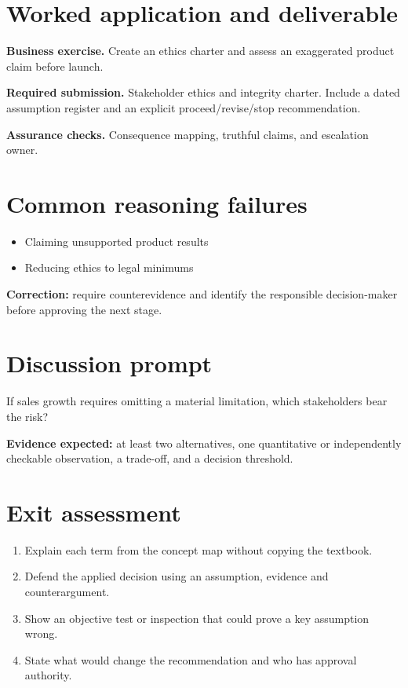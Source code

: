 \documentclass[11pt,letterpaper]{article}
\begin{document}
\section{Worked application and deliverable}
\textbf{Business exercise.} Create an ethics charter and assess an exaggerated product claim before launch.\par\textbf{Required submission.} Stakeholder ethics and integrity charter. Include a dated assumption register and an explicit proceed/revise/stop recommendation.\par\textbf{Assurance checks.} Consequence mapping, truthful claims, and escalation owner.
\section{Common reasoning failures}
\begin{itemize}[leftmargin=*,itemsep=3pt]
\item Claiming unsupported product results
\item Reducing ethics to legal minimums
\end{itemize}
\noindent\textbf{Correction:} require counterevidence and identify the responsible decision-maker before approving the next stage.
\section{Discussion prompt}
If sales growth requires omitting a material limitation, which stakeholders bear the risk?\par\medskip\textbf{Evidence expected:} at least two alternatives, one quantitative or independently checkable observation, a trade-off, and a decision threshold.
\section{Exit assessment}
\begin{enumerate}[leftmargin=*,itemsep=5pt]
\item Explain each term from the concept map without copying the textbook.
\item Defend the applied decision using an assumption, evidence and counterargument.
\item Show an objective test or inspection that could prove a key assumption wrong.
\item State what would change the recommendation and who has approval authority.
\end{enumerate}

\end{document}
